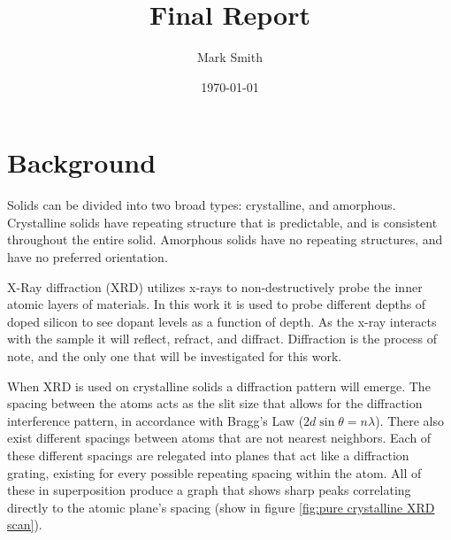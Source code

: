 \documentclass{article}
\title{Final Report}
\author{Mark Smith}
\date{\today}
\begin{document}
\maketitle






\section{Background}

    Solids can be divided into two broad types: crystalline, and amorphous. Crystalline solids have repeating structure that is predictable, and is consistent throughout the entire solid. Amorphous solids have no repeating structures, and have no preferred orientation.
    
    X-Ray diffraction (XRD) utilizes x-rays to non-destructively probe the inner atomic layers of materials. In this work it is used to probe different depths of doped silicon to see dopant levels as a function of depth. As the x-ray interacts with the sample it will reflect, refract, and diffract. Diffraction is the process of note, and the only one that will be investigated for this work. 

    When XRD is used on crystalline solids a diffraction pattern will emerge. The spacing between the atoms acts as the slit size that allows for the diffraction interference pattern, in accordance with Bragg's Law ($2d\sin\theta=n\lambda$). There also exist different spacings between atoms that are not nearest neighbors. Each of these different spacings are relegated into planes that act like a diffraction grating, existing for every possible repeating spacing within the atom. All of these in superposition produce a graph that shows sharp peaks correlating directly to the atomic plane's spacing (show in figure \ref{fig:pure crystalline XRD scan}).
    
\end{document}
